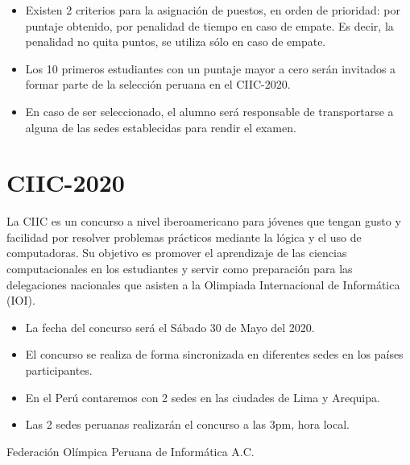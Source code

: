 \documentclass{article}
\begin{document}
\begin{itemize}
 \item 
Existen 2 criterios para la asignación de puestos, en orden de prioridad: por puntaje obtenido, por penalidad de tiempo en caso de empate.
Es decir, la penalidad no quita puntos, se utiliza sólo en caso de empate.

 \item 
Los 10 primeros estudiantes con un puntaje mayor a cero serán invitados a formar parte de la selección peruana en el CIIC-2020.

 \item 
En caso de ser seleccionado, el alumno será responsable de transportarse a alguna de las sedes establecidas para rendir el examen.
 
\end{itemize}

\section{CIIC-2020}

La CIIC es un concurso a nivel iberoamericano para jóvenes que tengan gusto y facilidad por resolver problemas prácticos mediante la lógica y el uso de computadoras. Su objetivo es promover el aprendizaje de las ciencias computacionales en los estudiantes y servir como preparación para las delegaciones nacionales que asisten a la Olimpiada Internacional de Informática (IOI).

\begin{itemize}
\item 
La fecha del concurso será el {\color{red} Sábado 30 de Mayo del 2020}.

\item 

El concurso se realiza de forma sincronizada en diferentes sedes en los países participantes.

\item 
En el Perú contaremos con 2 sedes en las ciudades de Lima y Arequipa.

\item 
Las 2 sedes peruanas realizarán el concurso a las 3pm, hora local.

\end{itemize}
\vspace*{1.5cm}

\hspace*{\fill}
Federación Olímpica Peruana de Informática A.C.

%
%
\end{document}
